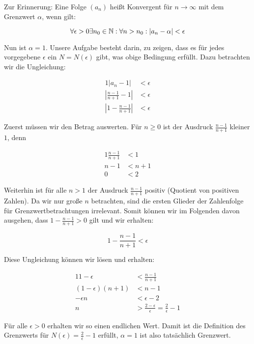 \item Zur Erinnerung: Eine Folge $(a_n)$ heißt Konvergent für $n\to\infty$ mit dem Grenzwert $\alpha$, wenn gilt:

$$
\forall \epsilon > 0 \exists n_0\in\mathbb{N}: \forall n > n_0 : |a_n - \alpha| < \epsilon
$$

Nun ist $\alpha=1$. Unsere Aufgabe besteht darin, zu zeigen, dass es für jedes vorgegebene $\epsilon$ ein $N=N(\epsilon)$ gibt, was obige Bedingung erfüllt. Dazu betrachten wir die Ungleichung:

\begin{alignat*}{1}
	|a_n - 1| &< \epsilon \\
	\left|\frac{n-1}{n+1} - 1\right| &< \epsilon \\
	\left|1 - \frac{n-1}{n+1}\right| &< \epsilon	
\end{alignat*}

Zuerst müssen wir den Betrag auswerten. Für $n \ge 0$ ist der Ausdruck $\frac{n-1}{n+1}$ kleiner $1$, denn

\begin{alignat*}{1}
	\frac{n-1}{n+1} &< 1 \\
	n -1 &< n + 1 \\
	0 &< 2
\end{alignat*}


Weiterhin ist für alle $n>1$ der Ausdruck $\frac{n-1}{n+1}$ positiv (Quotient von positiven Zahlen). Da wir nur große $n$ betrachten, sind die ersten Glieder der Zahlenfolge für Grenzwertbetrachtungen irrelevant. Somit können wir im Folgenden davon ausgehen, dass $1 - \frac{n-1}{n+1} > 0$ gilt und wir erhalten:

$$
	1 - \frac{n-1}{n+1} < \epsilon
$$

Diese Ungleichung können wir lösen und erhalten:

\begin{alignat*}{1}
	1-\epsilon &< \frac{n-1}{n+1} \\
	(1-\epsilon)(n+1) &< n -1 \\
	-\epsilon n &< \epsilon - 2 \\
	n &> \frac{2-\epsilon}{\epsilon} = \frac{2}{\epsilon} - 1
\end{alignat*}

Für alle $\epsilon > 0$ erhalten wir so einen endlichen Wert. Damit ist die Definition des Grenzwerts für $N(\epsilon) = \frac{2}{\epsilon} - 1$ erfüllt, $\alpha = 1$ ist also tatsächlich Grenzwert.
